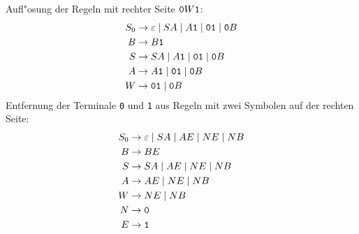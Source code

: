 {\begin{loesung}
Aufl"osung der Regeln mit rechter Seite ${\tt 0}W{\tt 1}$:
\begin{align*}
S_0&\to \varepsilon\;|\;SA\;|\;A{\tt 1}\;|\;{\tt 01}\;|\;{\tt 0}B\\
B  &\to B{\tt 1}\\
S  &\to SA\;|\;A{\tt 1}\;|\;{\tt 01}\;|\;{\tt 0}B\\
A  &\to A{\tt 1}\;|\;{\tt 01}\;|\;{\tt 0}B\\
W  &\to {\tt 01}\;|\; {\tt 0}B
\end{align*}
Entfernung der Terminale {\tt 0} und {\tt 1} aus Regeln mit zwei Symbolen
auf der rechten Seite:
\begin{align*}
S_0&\to \varepsilon\;|\;SA\;|\;AE\;|\;NE\;|\;NB\\
B  &\to BE\\
S  &\to SA\;|\;AE\;|\;NE\;|\;NB\\
A  &\to AE\;|\;NE\;|\;NB\\
W  &\to NE\;|\; NB\\
N  &\to {\tt 0}\\
E  &\to {\tt 1}
\end{align*}
\end{loesung}
}{ }

